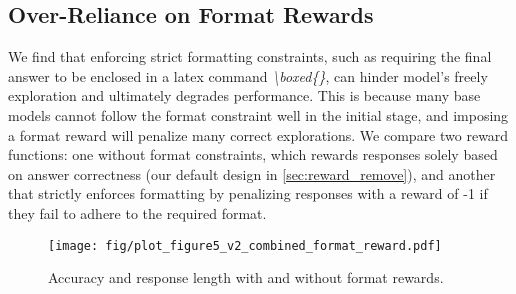 \documentclass{article} %
\begin{document}
\subsection{Over-Reliance on Format Rewards}

We find that enforcing strict formatting constraints, such as requiring the final answer to be enclosed in a latex command \textit{\textbackslash boxed\{\}}, can hinder model's freely exploration and ultimately degrades performance. This is because many base models cannot follow the format constraint well in the initial stage, and imposing a format reward will penalize many correct explorations. We compare two reward functions: one without format constraints, which rewards responses solely based on answer correctness (our default design in \textsection\ref{sec:reward_remove}), and another that strictly enforces formatting by penalizing responses with a reward of -1 if they fail to adhere to the required format.



\label{sec:remove_format}
 \begin{wrapfigure}{r}{0.48\columnwidth}
    \centering
    \texttt{[image: fig/plot\_figure5\_v2\_combined\_format\_reward.pdf]}\vspace{-10pt}
    \caption{Accuracy and response length with and without format rewards.}
    \label{fig:w&wo_format_reward}
    \vspace{-5pt}
\end{wrapfigure}
\end{document}
